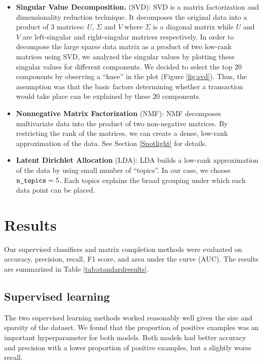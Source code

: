 \documentclass{article} %
\begin{document}
\begin{itemize}

    \item \textbf{Singular Value Decomposition.} (SVD): SVD is a matrix factorization and dimensionality reduction technique. It decomposes the original data into a product of 3 matrices: $U$, $\Sigma$ and $V$ where $\Sigma$ is a diagonal matrix while $U$ and $V$ are left-singular and right-singular matrices respectively. In order to decompose the large sparse data matrix as a product of two low-rank matrices using SVD, we analyzed the singular values by plotting these singular values for different components. We decided to select the top 20 components by observing a “knee” in the plot (Figure \ref{fig:svd}). Thus, the assumption was that the basic factors determining whether a transaction would take place can be explained by these 20 components.

    \item \textbf{Nonnegative Matrix Factorization} (NMF): NMF decomposes multivariate data into the product of two non-negative matrices. By restricting the rank of the matrices, we can create a dense, low-rank approximation of the data. See Section \ref{Spotlight} for details.

    \item \textbf{Latent Dirichlet Allocation} (LDA): LDA builds a low-rank approximation of the data by using small number of ``topics''. In our case, we choose $\texttt{\detokenize{n_topics}}=5$. Each topics explains the broad grouping under which each data point can  be placed.

\end{itemize}

\section{Results}

Our supervised classifiers and matrix completion methods were evaluated on accuracy, precision, recall, F1 score, and area under the curve (AUC). The results are summarized in Table \ref{tab:standardresults}.

\subsection{Supervised learning}

The two supervised learning methods worked reasonably well given the size and sparsity of the dataset. We found that the proportion of positive examples was an important hyperparameter for both models. Both models had better accuracy and precision with a lower proportion of positive examples, but a slightly worse recall.
\end{document}

